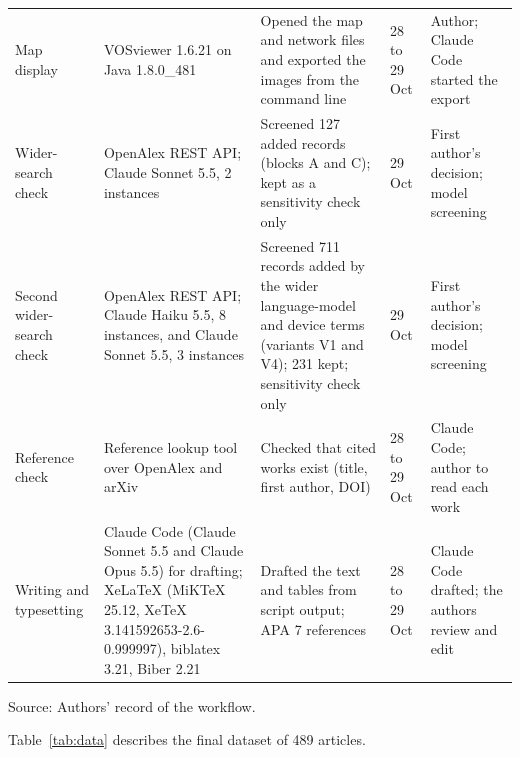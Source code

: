 \begin{table}[htbp]
\begin{tabularx}{\textwidth}{p{}YYp{0.08\textwidth}p{0.14\textwidth}}
Map display & VOSviewer 1.6.21 on Java 1.8.0\_481 & Opened the map and network files and exported the images from the command line & 28 to 29 Oct & Author; Claude Code started the export \\
Wider-search check & OpenAlex REST API; Claude Sonnet 5.5, 2 instances & Screened 127 added records (blocks A and C); kept as a sensitivity check only & 29 Oct & First author's decision; model screening \\
Second wider-search check & OpenAlex REST API; Claude Haiku 5.5, 8 instances, and Claude Sonnet 5.5, 3 instances & Screened 711 records added by the wider language-model and device terms (variants V1 and V4); 231 kept; sensitivity check only & 29 Oct & First author's decision; model screening \\
Reference check & Reference lookup tool over OpenAlex and arXiv & Checked that cited works exist (title, first author, DOI) & 28 to 29 Oct & Claude Code; author to read each work \\
Writing and typesetting & Claude Code (Claude Sonnet 5.5 and Claude Opus 5.5) for drafting; XeLaTeX (MiKTeX 25.12, XeTeX 3.141592653-2.6-0.999997), biblatex 3.21, Biber 2.21 & Drafted the text and tables from script output; APA 7 references & 28 to 29 Oct & Claude Code drafted; the authors review and edit \\ \hline
\end{tabularx}
\par\vspace{2pt}Source: Authors' record of the workflow.
\end{table}

Table~\ref{tab:data} describes the final dataset of 489 articles.

